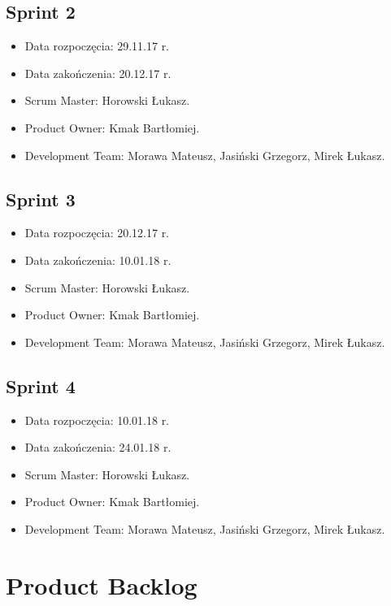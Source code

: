 \documentclass[a4paper]{article}
\begin{document}
\subsection{Sprint 2}

\begin{itemize}
\item Data rozpoczęcia: 29.11.17 r.
\item Data zakończenia: 20.12.17 r.
\item Scrum Master: Horowski Łukasz.
\item Product Owner: Kmak Bartłomiej.
\item Development Team: Morawa Mateusz, Jasiński Grzegorz, Mirek Łukasz.
\end{itemize}

\subsection{Sprint 3}

\begin{itemize}
\item Data rozpoczęcia: 20.12.17 r.
\item Data zakończenia: 10.01.18 r.
\item Scrum Master: Horowski Łukasz.
\item Product Owner: Kmak Bartłomiej.
\item Development Team: Morawa Mateusz, Jasiński Grzegorz, Mirek Łukasz.
\end{itemize}

\subsection{Sprint 4}

\begin{itemize}
\item Data rozpoczęcia: 10.01.18 r.
\item Data zakończenia: 24.01.18 r.
\item Scrum Master: Horowski Łukasz.
\item Product Owner: Kmak Bartłomiej.
\item Development Team: Morawa Mateusz, Jasiński Grzegorz, Mirek Łukasz.
\end{itemize}

\section{Product Backlog}
\end{document}
